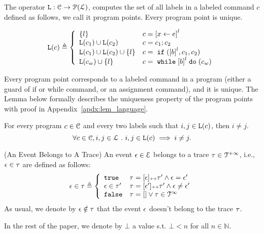 The operator $\mathtt{L}: \mathcal{C} \to \mathcal{P}(\mathcal{L})$,
computes the set of all labels
in a labeled command $c$ defined as follows, we call it program points.
Every program point is unique.
\begin{defn}
\label{def:progl}
{\small
\[
 \progl(c) \triangleq
 \left\{
 \begin{array}{ll}
 \{l\} 
 & {c} = \clabel{\assign x \expr}^{l} 
 \\
 \progl({c_1}) \cup \progl({{c_2}}) 
 & {c} = {c_1};{c_2}
 \\
 \progl(c_1) \cup \progl({{c_2}}) \cup \{l\} 
 & {c} =\eif(\clabel{\bexpr}^{l}, c_1, c_2) 
 \\
 \progl(c_w) \cup \{l\} 
 & {c} = \ewhile \clabel{\bexpr}^{l} \edo (c_w)
\end{array}
\right.
\]
}
\end{defn}
%
Every program point corresponds to a labeled command in a program (either a guard of if or while command, or an assignment command), and it is unique.
The Lemma below formally describes the uniqueness property of the program points
with proof in Appendix~\ref{apdx:lem_language}.
\begin{lem}
 \label{lem:label_unique}
 For every program $c \in \mathcal{C}$ and every two labels such that
 $i, j \in \mathtt{L}(c)$, then $i \neq j$.
 \[
 \forall c \in \mathcal{C}, i, j \in \mathcal{L} ~.~ i, j \in \mathtt{L}(c)\implies i \neq j.
 \]
\end{lem}
%
\begin{defn}(An Event Belongs to A Trace)
 An event $\mathtt{\epsilon} \in \mathcal{E}$ belongs to a trace $\mathtt{\tau} \in \mathcal{T}^{+\infty}$, i.e., $\mathtt{\epsilon} \in \mathtt{\tau}$ are defined as follows:
%
\begin{equation*}
 \event \in \trace 
 \triangleq \left\{
 \begin{array}{ll} 
 \etrue & \trace = [\event] \tracecat \trace'
 \land \event = \event' \\
 \event \in \trace' & \trace = [\event'] \tracecat \trace'
 \land \event \neq \event' \\ 
 \efalse & \trace = [] \lor \trace \in \inftdom
 \end{array}
 \right.
\end{equation*}
As usual, we denote by $\mathtt{\epsilon} \notin \mathtt{\tau}$ that the event $\mathtt{\epsilon}$ doesn't belong to the trace $\mathtt{\tau}$.
\end{defn}
%
In the rest of the paper, we denote by $\bot$ a value s.t. $\bot < n $ for all $n \in \mathbb{N}$.
